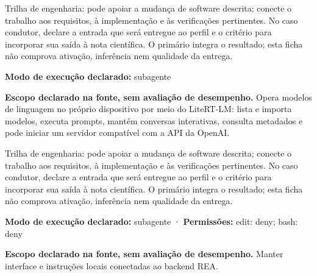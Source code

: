 \begin{funcao}
Trilha de engenharia: pode apoiar a mudança de software descrita; conecte o trabalho aos requisitos, à implementação e às verificações pertinentes. No caso condutor, declare a entrada que será entregue ao perfil e o critério para incorporar sua saída à nota científica. O primário integra o resultado; esta ficha não comprova ativação, inferência nem qualidade da entrega.
\end{funcao}

\begin{arquitetura}
\textbf{Modo de execução declarado:} subagente
\end{arquitetura}


\begin{descricao}
\textbf{Escopo declarado na fonte, sem avaliação de desempenho.}
Opera modelos de linguagem no próprio dispositivo por meio do LiteRT-LM: lista e importa modelos, executa prompts, mantém conversas interativas, consulta metadados e pode iniciar um servidor compatível com a API da OpenAI.
\end{descricao}

\begin{funcao}
Trilha de engenharia: pode apoiar a mudança de software descrita; conecte o trabalho aos requisitos, à implementação e às verificações pertinentes. No caso condutor, declare a entrada que será entregue ao perfil e o critério para incorporar sua saída à nota científica. O primário integra o resultado; esta ficha não comprova ativação, inferência nem qualidade da entrega.
\end{funcao}

\begin{arquitetura}
\textbf{Modo de execução declarado:} subagente · \textbf{Permissões:} edit: deny; bash: deny
\end{arquitetura}


\begin{descricao}
\textbf{Escopo declarado na fonte, sem avaliação de desempenho.}
Manter interface e instruções locais conectadas ao backend REA.
\end{descricao}

